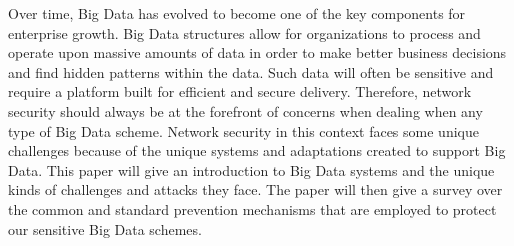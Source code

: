 Over time, Big Data has evolved to become one of the key components for enterprise growth. Big Data structures allow for organizations to process and operate upon massive amounts of data in order to make better business decisions and find hidden patterns within the data. Such data will often be sensitive and require a platform built for efficient and secure delivery. Therefore, network security should always be at the forefront of concerns when dealing when any type of Big Data scheme. Network security in this context faces some unique challenges because of the unique systems and adaptations created to support Big Data. This paper will give an introduction to Big Data systems and the unique kinds of challenges and attacks they face. The paper will then give a survey over the common and standard prevention mechanisms that are employed to protect our sensitive Big Data schemes.